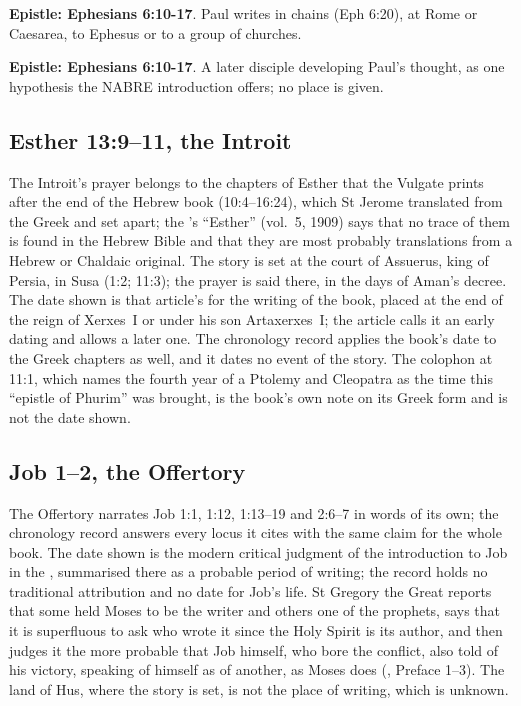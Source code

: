 \noindent\textbf{Epistle: Ephesians 6:10-17}. Paul writes in chains (Eph 6:20), at Rome or Caesarea, to Ephesus or to a group of churches.

\noindent\textbf{Epistle: Ephesians 6:10-17}. A later disciple developing Paul's thought, as one hypothesis the NABRE introduction offers; no place is given.


\subsection{Esther 13:9--11, the Introit}
\label{sec:date-esther}

The Introit's prayer belongs to the chapters of Esther that the Vulgate prints
after the end of the Hebrew book (10:4--16:24), which St Jerome translated from the
Greek and set apart; the 's ``Esther'' (vol.~5, 1909)
says that no trace of them is found in the Hebrew Bible and that they are most
probably translations from a Hebrew or Chaldaic original. The story is set at the
court of Assuerus, king of Persia, in Susa (1:2; 11:3); the prayer is said there,
in the days of Aman's decree. The date shown is that article's for the writing of
the book, placed at the end of the reign of Xerxes~I or under his son
Artaxerxes~I; the article calls it an early dating and allows a later one. The
chronology record applies the book's date to the Greek chapters as well, and it
dates no event of the story. The colophon at 11:1, which names the fourth year of a
Ptolemy and Cleopatra as the time this ``epistle of Phurim'' was brought, is the
book's own note on its Greek form and is not the date shown.

\subsection{Job 1--2, the Offertory}
\label{sec:date-job}

The Offertory narrates Job 1:1, 1:12, 1:13--19 and 2:6--7 in words of its own; the
chronology record answers every locus it cites with the same claim for the whole
book. The date shown is the modern critical judgment of the introduction to Job in
the , summarised there as a probable
period of writing; the record holds no traditional attribution and no date for
Job's life. St Gregory the Great reports that some held Moses to be the writer and
others one of the prophets, says that it is superfluous to ask who wrote it since
the Holy Spirit is its author, and then judges it the more probable that Job
himself, who bore the conflict, also told of his victory, speaking of himself as
of another, as Moses does (, Preface 1--3). The land of Hus, where the story is set,
is not the place of writing, which is unknown.

